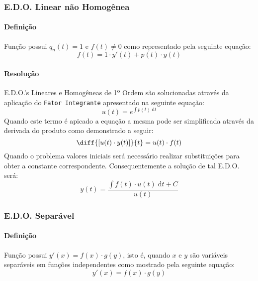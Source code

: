 \documentclass{article}
\begin{document}
            \subsubsection{E.D.O. Linear não Homogênea}
                \paragraph{Definição}Função possui $q_{n}(t) = 1$ e $f(t) \neq 0$ como representado pela seguinte equação:
                    \begin{equation}
                        f(t) = 1 \cdot y'(t) + p(t) \cdot y(t)
                    \end{equation}

                \paragraph{Resolução}E.D.O.'s Lineares e Homogêneas de 1º Ordem são solucionadas através da aplicação do \texttt{Fator Integrante} apresentado na seguinte equação:
                    \begin{equation*}
                        \boxed{
                            u(t) = e^{\int p(t)\;\text{d}t}
                        }
                    \end{equation*}
                Quando este termo é apicado a equação a mesma pode ser simplificada através da derivada do produto como demonstrado a seguir:
                    \begin{equation*}
                        \diff{[u(t) \cdot y(t)]}{t} = u(t) \cdot f(t)
                    \end{equation*}
                Quando o problema valores iniciais será necessário realizar substituições para obter a constante correspondente. Consequentemente a solução de tal E.D.O. será:
                    \begin{equation}
                        \boxed{
                            y(t) = \frac{\int{f(t) \cdot u(t)\;\text{d}t + C}}{u(t)}
                        }
                    \end{equation}

            \subsubsection{E.D.O. Separável}
                \paragraph{Definição}Função possui $y'(x)=f(x) \cdot g(y)$, isto é, quando $x$ e $y$ são variáveis separáveis em funções independentes como mostrado pela seguinte equação:
                    \begin{equation}
                        y'(x)=f(x) \cdot g(y)
                    \end{equation}
\end{document}
